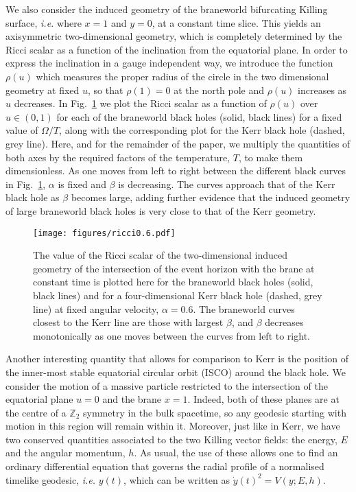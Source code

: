 \documentclass[%
 reprint,
 amsmath,amssymb,
 aps,
]{revtex4-2}
\begin{document}
We also consider the induced geometry of the braneworld bifurcating Killing surface, \textit{i.e.} where $x=1$ and $y=0$, at a constant time slice. This yields an axisymmetric two-dimensional geometry, which is completely determined by the Ricci scalar as a function of the inclination from the equatorial plane. In order to express the inclination in a gauge independent way, we introduce the function $\rho(u)$ which measures the proper radius of the circle in the two dimensional geometry at fixed $u$, so that $\rho(1)=0$ at the north pole and $\rho(u)$ increases as $u$ decreases. In Fig.~\ref{fig:ricci} we plot the Ricci scalar as a function of $\rho(u)$ over $u \in (0,1)$ for each of the braneworld black holes (solid, black lines) for a fixed value of $\Omega/T$, along with the corresponding plot for the Kerr black hole (dashed, grey line). Here, and for the remainder of the paper, we multiply the quantities of both axes by the required factors of the temperature, $T$, to make them dimensionless. As one moves from left to right between the different black curves in Fig.~\ref{fig:ricci}, $\alpha$ is fixed and $\beta$ is decreasing.  The curves approach that of the Kerr black hole as $\beta$ becomes large, adding further evidence that the induced geometry of large braneworld black holes is very close to that of the Kerr geometry.
\begin{figure}[h]
\texttt{[image: figures/ricci0.6.pdf]}
\caption{\label{fig:ricci} The value of the Ricci scalar of the two-dimensional induced geometry of the intersection of the event horizon with the brane at constant time is plotted here for the braneworld black holes (solid, black lines) and for a four-dimensional Kerr black hole (dashed, grey line) at fixed angular velocity, $\alpha=0.6$. The braneworld curves closest to the Kerr line are those with largest $\beta$, and $\beta$ decreases monotonically as one moves between the curves from left to right.}
\end{figure}

Another interesting quantity that allows for comparison to Kerr is the position of the inner-most stable equatorial circular orbit (ISCO) around the black hole. We consider the motion of a massive particle restricted to the intersection of the equatorial plane $u=0$ and the brane $x=1$. Indeed, both of these planes are at the centre of a $\mathbb{Z}_2$ symmetry in the bulk spacetime, so any geodesic starting with motion in this region will remain within it. Moreover, just like in Kerr, we have two conserved quantities associated to the two Killing vector fields: the energy, $E$ and the angular momentum, $h$. As usual, the use of these allows one to find an ordinary differential equation that governs the radial profile of a normalised timelike geodesic, \emph{i.e.} $y(t)$, which can be written as $\dot{y}(t)^2 = V(y;E,h)$.
\end{document}
